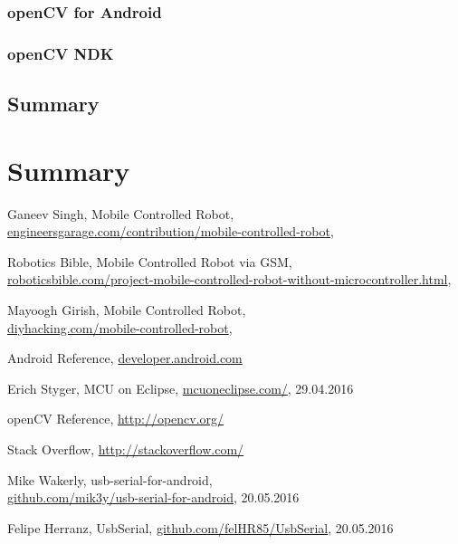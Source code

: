 \documentclass[openany]{mgr} %
\begin{document}
\subsection{openCV for Android}

\subsection{openCV NDK}

\section{Summary}

\chapter{Summary}

\begin{thebibliography}{9}

Ganeev Singh, Mobile Controlled Robot,\\
\url{engineersgarage.com/contribution/mobile-controlled-robot},
\date{29.05.2016}

Robotics Bible, Mobile Controlled Robot via GSM,\\
\url{roboticsbible.com/project-mobile-controlled-robot-without-microcontroller.html},
\date{29.05.2016}

Mayoogh Girish, Mobile Controlled Robot,\\
\url{diyhacking.com/mobile-controlled-robot},
\date{29.05.2016}

Android Reference,
\url{developer.android.com}

Erich Styger, MCU on Eclipse,
\url{mcuoneclipse.com/},
29.04.2016

openCV Reference,
\url{http://opencv.org/}

Stack Overflow,
\url{http://stackoverflow.com/}

Mike Wakerly, usb-serial-for-android,\\
\url{github.com/mik3y/usb-serial-for-android},
20.05.2016

Felipe Herranz, UsbSerial,
\url{github.com/felHR85/UsbSerial},
20.05.2016

\end{thebibliography}
\end{document}
